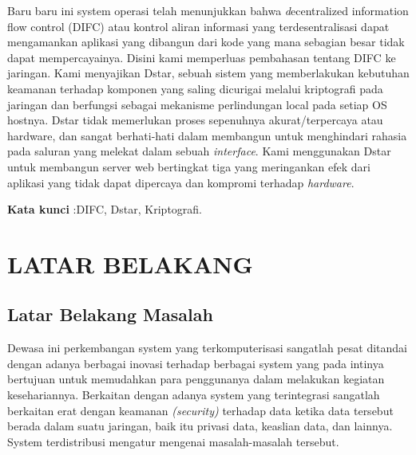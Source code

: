 \documentclass{jtetiproposalskripsi}
\begin{document}
\cover

\approvalpage


\begin{abstractind}
Baru baru ini system operasi telah menunjukkan bahwa  \emph decentralized information flow control (DIFC) atau kontrol aliran informasi yang terdesentralisasi dapat mengamankan aplikasi yang dibangun dari kode yang mana sebagian besar tidak dapat mempercayainya. Disini kami memperluas pembahasan tentang DIFC ke jaringan. Kami menyajikan Dstar, sebuah sistem yang memberlakukan kebutuhan keamanan terhadap komponen yang saling dicurigai melalui kriptografi pada jaringan dan berfungsi sebagai mekanisme perlindungan local pada setiap OS hostnya. Dstar tidak memerlukan proses sepenuhnya akurat/terpercaya atau hardware, dan sangat berhati-hati  dalam membangun untuk menghindari rahasia pada saluran yang melekat dalam sebuah  \emph{interface}. Kami menggunakan Dstar untuk membangun server web bertingkat tiga yang meringankan efek dari aplikasi yang tidak dapat dipercaya dan kompromi terhadap \emph {hardware}.



\bigskip
\textbf{Kata kunci} :DIFC, Dstar, Kriptografi.
\end{abstractind}

\tableofcontents
{}
\clearpage{}\setcounter{page}{1}

\chapter{LATAR BELAKANG}

\section{Latar Belakang Masalah}
Dewasa ini perkembangan system yang terkomputerisasi sangatlah pesat ditandai dengan adanya berbagai inovasi terhadap berbagai system yang pada intinya bertujuan untuk memudahkan para penggunanya dalam melakukan kegiatan kesehariannya. Berkaitan dengan adanya system yang terintegrasi sangatlah berkaitan erat dengan keamanan \emph{(security)} terhadap data ketika data tersebut berada dalam suatu jaringan, baik itu privasi data, keaslian data, dan lainnya. System terdistribusi mengatur mengenai masalah-masalah tersebut.
\end{document}
